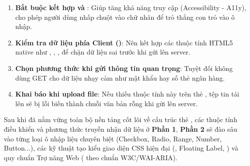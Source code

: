 \begin{noteBox}
\begin{enumerate}[leftmargin=1.5em, itemsep=3pt, parsep=0pt]
    \item \textbf{Bắt buộc kết hợp  và }: Giúp tăng khả năng truy cập (Accessibility - A11y), cho phép người dùng nhấp chuột vào chữ nhãn để trỏ thẳng con trỏ vào ô nhập.
    \item \textbf{Kiểm tra dữ liệu phía Client ()}: Nên kết hợp các thuộc tính HTML5 native như , , ,  để chặn dữ liệu sai trước khi gửi lên server.
    \item \textbf{Chọn phương thức  khi gửi thông tin quan trọng}: Tuyệt đối không dùng GET cho dữ liệu nhạy cảm như mật khẩu hay số thẻ ngân hàng.
    \item \textbf{Khai báo  khi upload file}: Nếu thiếu thuộc tính này trên thẻ , tệp tin tải lên sẽ bị lỗi biến thành chuỗi văn bản rỗng khi gửi lên server.
\end{enumerate}
\end{noteBox}


\clearpage
\begin{tcolorbox}[
    enhanced,
    before=\par\vspace{10pt}\noindent,
    after=\par\vspace{14pt},
    width=\linewidth,
    colback=accentOrange!4!white,
    colframe=accentOrange,
    boxrule=1.2pt,
    arc=7pt,
    drop shadow=black!4!white,
    title={\large\sffamily\bfseries\color{white} PHẦN 2: CHUYÊN SÂU TỪNG Ô NHẬP LIỆU, ĐỊNH DẠNG CSS \& TRỢ NĂNG A11Y},
    coltitle=white,
    fonttitle=\bfseries\sffamily,
    top=10pt, bottom=10pt, left=14pt, right=14pt
]
\sffamily\small
Sau khi đã nắm vững toàn bộ nền tảng cốt lõi về cấu trúc thẻ , các thuộc tính điều khiển và phương thức truyền nhận dữ liệu ở \textbf{Phần 1}, \textbf{Phần 2} sẽ đào sâu vào từng loại ô nhập liệu chuyên biệt (Checkbox, Radio, Range, Number, Button...), các kỹ thuật tạo kiểu giao diện CSS hiện đại (, Floating Label, ) và quy chuẩn Trợ năng Web ( theo chuẩn W3C/WAI-ARIA).
\end{tcolorbox}
\vspace{6pt}

